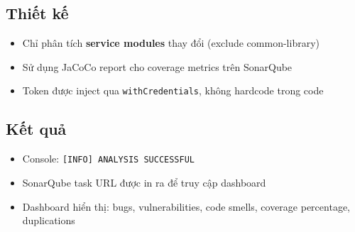 \subsection{Thiết kế}
\begin{itemize}[noitemsep]
    \item Chỉ phân tích \textbf{service modules} thay đổi (exclude common-library)
    \item Sử dụng JaCoCo report cho coverage metrics trên SonarQube
    \item Token được inject qua \texttt{withCredentials}, không hardcode trong code
\end{itemize}

\subsection{Kết quả}
\begin{itemize}[noitemsep]
    \item Console: \texttt{[INFO] ANALYSIS SUCCESSFUL}
    \item SonarQube task URL được in ra để truy cập dashboard
    \item Dashboard hiển thị: bugs, vulnerabilities, code smells, coverage percentage, duplications
\end{itemize}

